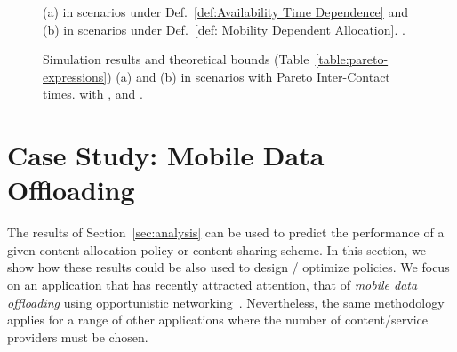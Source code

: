 \documentclass[journal]{IEEEtran}
\begin{document}
\begin{figure}
\centering
{}
\caption{(a)  in scenarios under Def.~\ref{def:Availability Time Dependence} and (b)  in scenarios under Def.~\ref{def: Mobility Dependent Allocation}. .
}
\label{fig:synth-gLinear-extensions}
\end{figure}


\begin{figure}
\centering
{}
\caption{Simulation results and theoretical bounds (Table~\ref{table:pareto-expressions}) (a)  and (b)  in scenarios with Pareto Inter-Contact times.  with , and .}
\label{fig:paretoICT}
\end{figure}









\section{Case Study: Mobile Data Offloading}\label{sec:applications}
The results of Section~\ref{sec:analysis} can be used to predict the performance of a given content allocation policy or content-sharing scheme. In this section, we show how these results could be also used to design / optimize policies. We focus on an application that has recently attracted attention, that of \textit{mobile data offloading} using opportunistic networking~\cite{offloading-wowmom11,Hui-Offloading, multiple-offloading}. Nevertheless, the same methodology applies for a range of other applications where the number of content/service providers must be chosen.    
\end{document}

